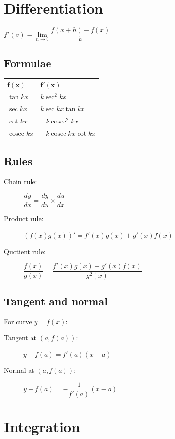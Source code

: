 \documentclass[A4paper]{article}
\DeclareMathOperator\cosec{cosec}
\begin{document}
	\pagebreak

	\section{Differentiation}

	$f'(x) = \lim\limits_{n \to 0}\dfrac{f(x+h)-f(x)}{h}$

	\subsection{Formulae}
	\begin{tabular}{ll}
		$\mathbf{f(x)}$ & $\mathbf{f'(x)}$ \\
		$\tan kx$ & $k\sec^2 kx$ \\
		$\sec kx$ & $k\sec kx \tan kx$ \\
		$\cot kx$ & $-k\cosec^2 kx$ \\
		$\cosec kx$ & $-k\cosec kx \cot kx$ \\
	\end{tabular}

	\subsection{Rules}
	\begin{description}
		\item[Chain rule:] $\dfrac{dy}{dx} = \dfrac{dy}{du} \times \dfrac{du}{dx}$
		\item[Product rule:] $(f(x)g(x))'=f'(x)g(x)+g'(x)f(x)$
		\item[Quotient rule:] $\dfrac{f(x)}{g(x)} = \dfrac{f'(x)g(x)-g'(x)f(x)}{g^2(x)}$
	\end{description}


	\subsection{Tangent and normal}
	For curve $y=f(x)$:
	\begin{description}
		\item[Tangent at $(a,f(a))$:] $y-f(a)=f'(a)(x-a)$
		\item[Normal at $(a,f(a))$:] $y-f(a)=-\dfrac{1}{f'(a)}(x-a)$
	\end{description}




	\pagebreak

	\section{Integration}
	
\end{document}
